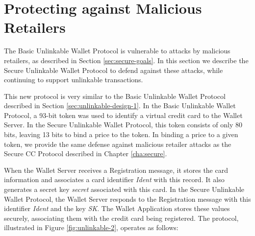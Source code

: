 \section{Protecting against Malicious Retailers}
\label{sec:unlinkable-design-2}

The Basic Unlinkable Wallet Protocol is vulnerable to attacks by malicious retailers, as described in Section \ref{sec:secure-goals}.
In this section we describe the Secure Unlinkable Wallet Protocol to defend against these attacks, while continuing to support unlinkable transactions.

This new protocol is very similar to the Basic Unlinkable Wallet Protocol described in Section \ref{sec:unlinkable-design-1}.
In the Basic Unlinkable Wallet Protocol, a 93-bit token was used to identify a virtual credit card to the Wallet Server.
In the Secure Unlinkable Wallet Protocol, this token consists of only 80 bits, leaving 13 bits to bind a price to the token.
In binding a price to a given token, we provide the same defense against malicious retailer attacks as the Secure CC Protocol described in Chapter \ref{cha:secure}.

When the Wallet Server receives a Registration message, it stores the card information and associates a card identifier \emph{Ident} with this record.
It also generates a secret key \emph{secret} associated with this card.
In the Secure Unlinkable Wallet Protocol, the Wallet Server responds to the Registration message with this identifier \emph{Ident} and the key \emph{SK}.
The Wallet Application stores these values securely, associating them with the credit card being registered.
The protocol, illustrated in Figure \ref{fig:unlinkable-2}, operates as follows:

